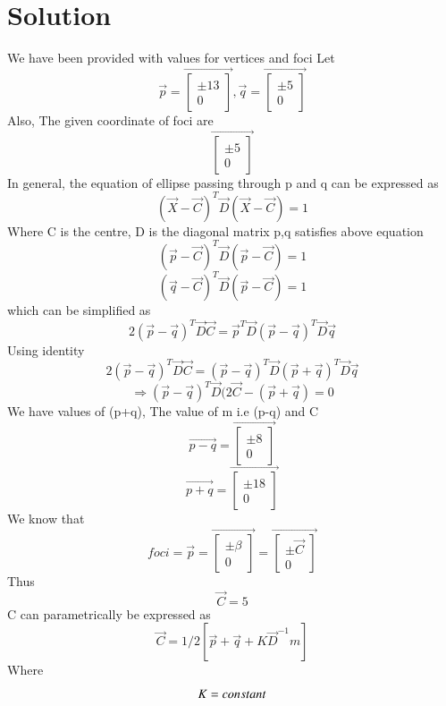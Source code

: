\documentclass[journal,12pt,twocolumn]{IEEEtran}
\begin{document}
\section{Solution}
We have been provided with values for vertices and foci
\newline
Let
$$\vec {p}=\vec{\begin{bmatrix}\pm 13 \\ 0 \end{bmatrix}},
\vec {q}=\vec{\begin{bmatrix}\pm 5 \\ 0 \end{bmatrix}}$$
Also, The given coordinate of foci are $$\vec{\begin{bmatrix}\pm 5 \\ 0 \end{bmatrix}}$$
In general, the equation of ellipse passing through p and q can be expressed as 
$$(\vec{X}-\vec{C})^T\vec{D} (\vec{X}-\vec{C})=1$$
Where
\newline
C is the centre, D is the diagonal matrix 
p,q satisfies above equation
$$(\vec{p}-\vec{C})^T \vec{D} (\vec{p}-\vec{C})=1$$
$$(\vec{q}-\vec{C})^T \vec{D} (\vec{p}-\vec{C})=1$$
which can be simplified as 
$$2(\vec{p}-\vec{q})^T \vec{D}\vec{C}= \vec{p}^T \vec{D}(\vec{p}-\vec{q})^T \vec{D}\vec{q}$$
Using identity
$$2(\vec{p}-\vec{q})^T \vec{D}\vec{C}= (\vec{p}-\vec{q})^T\vec{D}(\vec{p}+\vec{q})^T\vec{D}\vec{q}$$
$$\Rightarrow (\vec{p}-\vec{q})^T \vec{D} (2\vec{C}-(\vec{p}+\vec{q}) = 0$$
We have values of (p+q), The value of m i.e (p-q) and C
$$\vec {p-q}=\vec{\begin{bmatrix}\pm 8 \\ 0 \end{bmatrix}}$$
$$\vec {p+q}=\vec{\begin{bmatrix}\pm 18 \\ 0 \end{bmatrix}}$$
We know that $$foci= \vec{p}=\vec{\begin{bmatrix}\pm \beta \\ 0 \end{bmatrix}}=\vec{\begin{bmatrix}\pm \vec{C} \\ 0 \end{bmatrix}}$$
Thus $$\vec{C}=5$$
C can parametrically be expressed as
\begin{equation}
\vec{C}=1/2 [\vec{p}+\vec{q}+K\vec{D}^{-1}m]
\end{equation}
Where
$$\newline K= constant$$
\end{document}
